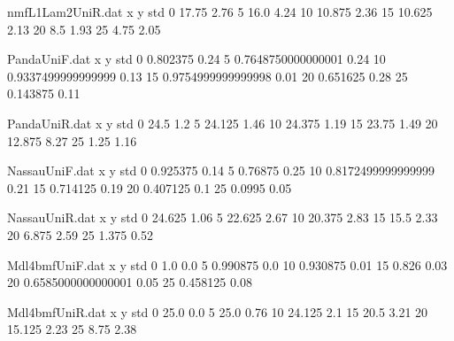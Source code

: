 \begin{filecontents}{nmfL1Lam2UniR.dat}
x y std
0 17.75 2.76
5 16.0 4.24
10 10.875 2.36
15 10.625 2.13
20 8.5 1.93
25 4.75 2.05
\end{filecontents}
\begin{filecontents}{PandaUniF.dat}
x y std
0 0.802375 0.24
5 0.7648750000000001 0.24
10 0.9337499999999999 0.13
15 0.9754999999999998 0.01
20 0.651625 0.28
25 0.143875 0.11
\end{filecontents}
\begin{filecontents}{PandaUniR.dat}
x y std
0 24.5 1.2
5 24.125 1.46
10 24.375 1.19
15 23.75 1.49
20 12.875 8.27
25 1.25 1.16
\end{filecontents}
\begin{filecontents}{NassauUniF.dat}
x y std
0 0.925375 0.14
5 0.76875 0.25
10 0.8172499999999999 0.21
15 0.714125 0.19
20 0.407125 0.1
25 0.0995 0.05
\end{filecontents}
\begin{filecontents}{NassauUniR.dat}
x y std
0 24.625 1.06
5 22.625 2.67
10 20.375 2.83
15 15.5 2.33
20 6.875 2.59
25 1.375 0.52
\end{filecontents}
\begin{filecontents}{Mdl4bmfUniF.dat}
x y std
0 1.0 0.0
5 0.990875 0.0
10 0.930875 0.01
15 0.826 0.03
20 0.6585000000000001 0.05
25 0.458125 0.08
\end{filecontents}
\begin{filecontents}{Mdl4bmfUniR.dat}
x y std
0 25.0 0.0
5 25.0 0.76
10 24.125 2.1
15 20.5 3.21
20 15.125 2.23
25 8.75 2.38
\end{filecontents}
